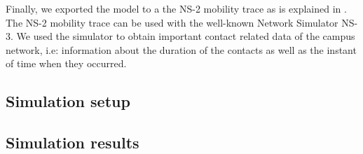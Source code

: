 Finally, we exported the model to a the NS-2 mobility trace as is explained in . The NS-2 mobility trace can be used with the well-known Network Simulator NS-3. We used the simulator to obtain important contact related data of the campus network, i.e: information about the duration of the contacts as well as the instant of time when they occurred.

\subsection{Simulation setup}


\subsection{Simulation results}

